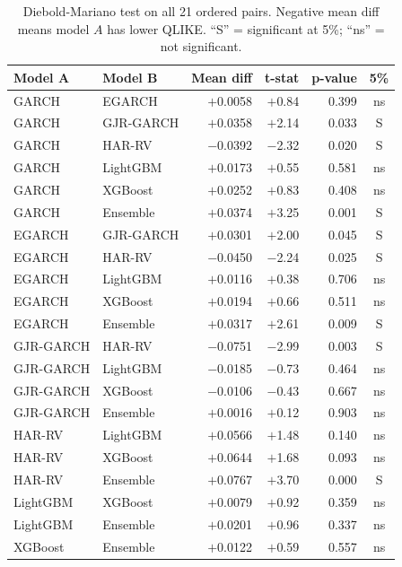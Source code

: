 \begin{table}[H]
\centering
\small
\setlength{\tabcolsep}{4pt}
\caption{Diebold-Mariano test on all 21 ordered pairs. Negative mean diff means model $A$ has lower QLIKE. ``S'' = significant at 5\%; ``ns'' = not significant.}
\label{tab:demo_dm}
\begin{tabular}{l l r r r c}
\toprule
\textbf{Model A} & \textbf{Model B} & \textbf{Mean diff} & \textbf{t-stat} & \textbf{p-value} & \textbf{5\%} \\
\midrule
GARCH       & EGARCH       & $+$0.0058 & $+$0.84 & 0.399 & ns \\
GARCH       & GJR-GARCH    & $+$0.0358 & $+$2.14 & 0.033 & S  \\
GARCH       & HAR-RV       & $-$0.0392 & $-$2.32 & 0.020 & S  \\
GARCH       & LightGBM     & $+$0.0173 & $+$0.55 & 0.581 & ns \\
GARCH       & XGBoost      & $+$0.0252 & $+$0.83 & 0.408 & ns \\
GARCH       & Ensemble     & $+$0.0374 & $+$3.25 & 0.001 & S  \\
EGARCH      & GJR-GARCH    & $+$0.0301 & $+$2.00 & 0.045 & S  \\
EGARCH      & HAR-RV       & $-$0.0450 & $-$2.24 & 0.025 & S  \\
EGARCH      & LightGBM     & $+$0.0116 & $+$0.38 & 0.706 & ns \\
EGARCH      & XGBoost      & $+$0.0194 & $+$0.66 & 0.511 & ns \\
EGARCH      & Ensemble     & $+$0.0317 & $+$2.61 & 0.009 & S  \\
GJR-GARCH   & HAR-RV       & $-$0.0751 & $-$2.99 & 0.003 & S  \\
GJR-GARCH   & LightGBM     & $-$0.0185 & $-$0.73 & 0.464 & ns \\
GJR-GARCH   & XGBoost      & $-$0.0106 & $-$0.43 & 0.667 & ns \\
GJR-GARCH   & Ensemble     & $+$0.0016 & $+$0.12 & 0.903 & ns \\
HAR-RV      & LightGBM     & $+$0.0566 & $+$1.48 & 0.140 & ns \\
HAR-RV      & XGBoost      & $+$0.0644 & $+$1.68 & 0.093 & ns \\
HAR-RV      & Ensemble     & $+$0.0767 & $+$3.70 & 0.000 & S  \\
LightGBM    & XGBoost      & $+$0.0079 & $+$0.92 & 0.359 & ns \\
LightGBM    & Ensemble     & $+$0.0201 & $+$0.96 & 0.337 & ns \\
XGBoost     & Ensemble     & $+$0.0122 & $+$0.59 & 0.557 & ns \\
\bottomrule
\end{tabular}
\end{table}

